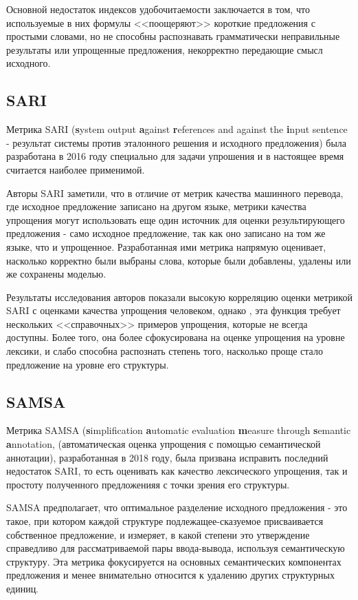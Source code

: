 Основной недостаток индексов удобочитаемости заключается в том, что используемые в них формулы <<поощеряют>> короткие предложения с простыми словами, но не способны распознавать грамматически неправильные результаты или упрощенные предложения, некорректно передающие смысл исходного.

\subsection{SARI}

Метрика SARI (\textbf{s}ystem output \textbf{a}gainst \textbf{r}eferences and against the \textbf{i}nput sentence - результат системы против эталонного решения и исходного предложения) была разработана в 2016 году специально для задачи упрошения и в настоящее время считается наиболее применимой\cite{xu_optimizing_2016}.

Авторы SARI заметили, что в отличие от метрик качества машинного перевода, где исходное предложение записано на другом языке, метрики качества упрощения могут использовать еще один источник для оценки результирующего предложения - само исходное предложение, так как оно записано на том же языке, что и упрощенное. Разработанная ими метрика напрямую оценивает, насколько корректно были выбраны слова, которые были добавлены, удалены или же сохранены моделью.

Результаты исследования авторов показали высокую корреляцию оценки метрикой SARI с оценками качества упрощения человеком, однако , эта функция требует нескольких <<справочных>> примеров упрощения, которые не всегда доступны. Более того, она более сфокусирована на оценке упрощения на уровне лексики, и слабо способна распознать степень того, насколько проще стало предложение на уровне его структуры.

\subsection{SAMSA}

Метрика SAMSA (\textbf{s}implification \textbf{a}utomatic evaluation \textbf{m}easure through \textbf{s}emantic \textbf{a}nnotation, (автоматическая оценка упрощения с помощью семантической аннотации), разработанная в 2018 году, была призвана исправить последний недостаток SARI, то есть оценивать как качество лексического упрощения, так и простоту полученного предложенияя с точки зрения его структуры\cite{sulem_semantic_2018}.

SAMSA предполагает, что оптимальное разделение исходного предложения - это такое, при котором каждой структуре подлежащее-сказуемое присваивается собственное предложение, и измеряет, в какой степени это утверждение справедливо для рассматриваемой пары ввода-вывода, используя семантическую структуру. Эта метрика фокусируется на основных семантических компонентах предложения и менее внимательно относится к удалению других структурных единиц.

